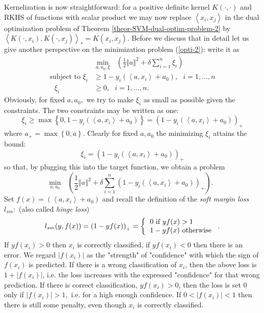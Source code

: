 \documentclass[11pt,twoside]{article}%
\theoremstyle{change}
\begin{document}
Kernelization is now straightforward: for a positive definite kernel
$K(\cdot,\cdot)$ and RKHS of functions with scalar product we may now replace
$\left\langle x_{i},x_{j}\right\rangle $ in the dual optimization problem of
Theorem \ref{theor-SVM-dual-optim-problem-2} by $\left\langle K(\cdot
,x_{i}),K(\cdot,x_{j})\right\rangle _{\ast}=K(x_{i},x_{j})$. Before we discuss
that in detail let us give another perspective on the minimization problem
(\ref{opti-2}): write it as
\begin{align*}
& \min_{a,a_{0},\xi}\text{\ }\left(  \frac{1}{2}\left\Vert a\right\Vert
^{2}+\delta\sum_{i=1}^{n}\xi_{i}\right)  \text{ }\\
\text{subject to }\xi_{i}  & \geq1-y_{i}\left(  \left\langle a,x_{i}%
\right\rangle +a_{0}\right)  ,\text{\ }i=1,\ldots,n\\
\text{ }\xi_{i}  & \geq0,\text{ \ }i=1,\ldots,n\text{.}%
\end{align*}
Obviously, for fixed $a,a_{0},$ we try to make $\xi_{i}$ as small as possible
given the constraints. The two constraints may be written as one:
\[
\xi_{i}\geq\max\left\{  0,1-y_{i}\left(  \left\langle a,x_{i}\right\rangle
+a_{0}\right)  \right\}  =\left(  1-y_{i}\left(  \left\langle a,x_{i}%
\right\rangle +a_{0}\right)  \right)  _{+}%
\]
where $a_{+}=\max\left\{  0,a\right\}  $. Clearly for fixed $a,a_{0}$ the
minimizing $\xi_{i}$ attains the bound:
\[
\xi_{i}=\left(  1-y_{i}\left(  \left\langle a,x_{i}\right\rangle
+a_{0}\right)  \right)  _{+}%
\]
so that, by plugging this into the target function, we obtain a problem
\[
\min_{a,a_{0}}\text{\ }\left(  \frac{1}{2}\left\Vert a\right\Vert ^{2}%
+\delta\sum_{i=1}^{n}\left(  1-y_{i}\left(  \left\langle a,x_{i}\right\rangle
+a_{0}\right)  \right)  _{+}\right)  .\text{ }%
\]
Set $f(x)=\left(  \left\langle a,x_{i}\right\rangle +a_{0}\right)  $ and
recall the definition of the \textit{soft margin loss} $l_{sm}:$ (also called
\textit{hinge loss})
\begin{equation}
l_{sm}(y,f(x))=\left(  1-yf(x)\right)  _{+}=\left\{
\begin{tabular}
[c]{l}%
$0$ if $yf(x)>1$\\
$1-yf(x)$ otherwise
\end{tabular}
\right.  .
\end{equation}
If $yf(x_{i})>0$ then $x_{i}$ is correctly classified, if $yf(x_{i})<0$ then
there is an error. We regard $\left\vert f(x_{i})\right\vert $ as the
"strength" of "confidence" with which the sign of $f(x_{i})$ is predicted. If
there is a wrong classification of $x_{i}$, then the above loss is
$1+\left\vert f(x_{i})\right\vert $, i.e. the loss increases with the
expressed "confidence" for that wrong prediction. If there is correct
classification, $yf(x_{i})>0$, then the loss is set $0$ only if $\left\vert
f(x_{i})\right\vert >1,$ i.e. for a high enough confidence. If $0<\left\vert
f(x_{i})\right\vert <1$ then there is still some penalty, even though $x_{i}$
is correctly classified.
\end{document}
